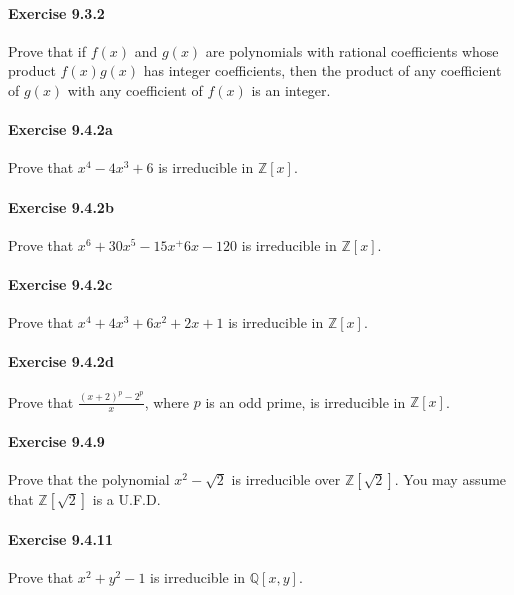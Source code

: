 \documentclass{article}
\begin{document}
\paragraph{Exercise 9.3.2} Prove that if $f(x)$ and $g(x)$ are polynomials with rational coefficients whose product $f(x) g(x)$ has integer coefficients, then the product of any coefficient of $g(x)$ with any coefficient of $f(x)$ is an integer.

\paragraph{Exercise 9.4.2a} Prove that $x^4-4x^3+6$ is irreducible in $\mathbb{Z}[x]$.

\paragraph{Exercise 9.4.2b} Prove that $x^6+30x^5-15x^+6x-120$ is irreducible in $\mathbb{Z}[x]$.

\paragraph{Exercise 9.4.2c} Prove that $x^4+4x^3+6x^2+2x+1$ is irreducible in $\mathbb{Z}[x]$.

\paragraph{Exercise 9.4.2d} Prove that $\frac{(x+2)^p-2^p}{x}$, where $p$ is an odd prime, is irreducible in $\mathbb{Z}[x]$.

\paragraph{Exercise 9.4.9} Prove that the polynomial $x^{2}-\sqrt{2}$ is irreducible over $\mathbb{Z}[\sqrt{2}]$. You may assume that $\mathbb{Z}[\sqrt{2}]$ is a U.F.D.

\paragraph{Exercise 9.4.11} Prove that $x^2+y^2-1$ is irreducible in $\mathbb{Q}[x,y]$.
\end{document}
